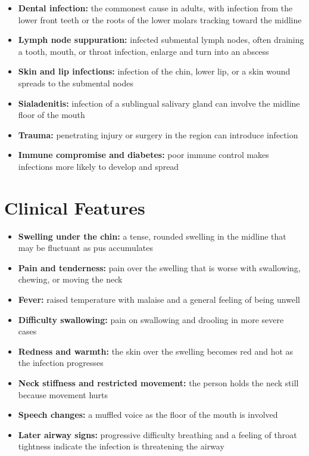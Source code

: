 \begin{itemize}
    \item \textbf{Dental infection:} the commonest cause in adults, with infection from the lower front teeth or the roots of the lower molars tracking toward the midline
    \item \textbf{Lymph node suppuration:} infected submental lymph nodes, often draining a tooth, mouth, or throat infection, enlarge and turn into an abscess
    \item \textbf{Skin and lip infections:} infection of the chin, lower lip, or a skin wound spreads to the submental nodes
    \item \textbf{Sialadenitis:} infection of a sublingual salivary gland can involve the midline floor of the mouth
    \item \textbf{Trauma:} penetrating injury or surgery in the region can introduce infection
    \item \textbf{Immune compromise and diabetes:} poor immune control makes infections more likely to develop and spread
\end{itemize}

\section*{Clinical Features}
\begin{itemize}
    \item \textbf{Swelling under the chin:} a tense, rounded swelling in the midline that may be fluctuant as pus accumulates
    \item \textbf{Pain and tenderness:} pain over the swelling that is worse with swallowing, chewing, or moving the neck
    \item \textbf{Fever:} raised temperature with malaise and a general feeling of being unwell
    \item \textbf{Difficulty swallowing:} pain on swallowing and drooling in more severe cases
    \item \textbf{Redness and warmth:} the skin over the swelling becomes red and hot as the infection progresses
    \item \textbf{Neck stiffness and restricted movement:} the person holds the neck still because movement hurts
    \item \textbf{Speech changes:} a muffled voice as the floor of the mouth is involved
    \item \textbf{Later airway signs:} progressive difficulty breathing and a feeling of throat tightness indicate the infection is threatening the airway
\end{itemize}

